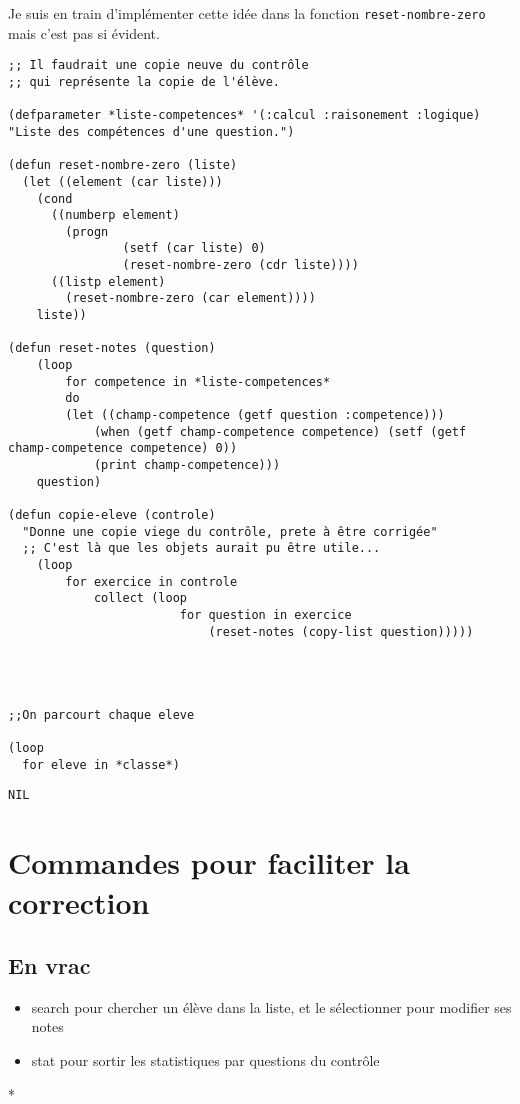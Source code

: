 \documentclass[a4paper, 11pt, DIV=18]{scrartcl}
\begin{document}
Je suis en train d'implémenter cette idée dans la fonction \texttt{reset-nombre-zero}
mais c'est pas si évident.
\begin{verbatim}
;; Il faudrait une copie neuve du contrôle
;; qui représente la copie de l'élève.

(defparameter *liste-competences* '(:calcul :raisonement :logique) "Liste des compétences d'une question.")

(defun reset-nombre-zero (liste)
  (let ((element (car liste)))
    (cond
      ((numberp element)
        (progn
                (setf (car liste) 0)
                (reset-nombre-zero (cdr liste))))
      ((listp element)
        (reset-nombre-zero (car element))))
    liste))

(defun reset-notes (question)
    (loop
        for competence in *liste-competences*
        do
        (let ((champ-competence (getf question :competence)))
            (when (getf champ-competence competence) (setf (getf champ-competence competence) 0))
            (print champ-competence)))
    question)

(defun copie-eleve (controle)
  "Donne une copie viege du contrôle, prete à être corrigée"
  ;; C'est là que les objets aurait pu être utile...
    (loop
        for exercice in controle
            collect (loop
                        for question in exercice
                            (reset-notes (copy-list question)))))




;;On parcourt chaque eleve

(loop
  for eleve in *classe*)
\end{verbatim}

\begin{verbatim}
NIL
\end{verbatim}

\section{Commandes pour faciliter la correction}
\label{sec:org25f69b3}

\subsection{En vrac}
\label{sec:orgc95728c}

\begin{itemize}
\item search pour chercher un élève dans la liste, et le sélectionner pour modifier
ses notes
\item stat pour sortir les statistiques par questions du contrôle
\end{itemize}

*
\end{document}
